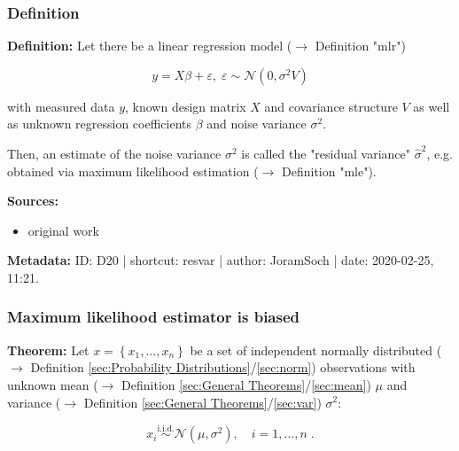 \documentclass[a4paper,12pt]{book}
\begin{document}
\subsubsection[\textit{Definition}]{Definition} \label{sec:resvar}

\vspace{1em}
\textbf{Definition:} Let there be a linear regression model ($\rightarrow$ Definition "mlr")

\begin{equation} \label{eq:resvar-mlr}
y = X\beta + \varepsilon, \; \varepsilon \sim \mathcal{N}(0, \sigma^2 V)
\end{equation}

with measured data $y$, known design matrix $X$ and covariance structure $V$ as well as unknown regression coefficients $\beta$ and noise variance $\sigma^2$.

Then, an estimate of the noise variance $\sigma^2$ is called the "residual variance" $\hat{\sigma}^2$, e.g. obtained via maximum likelihood estimation ($\rightarrow$ Definition "mle").

\vspace{1em}
\textbf{Sources:}
\begin{itemize}
\item original work\end{itemize}


\vspace{1em}
\textbf{Metadata:} ID: D20 | shortcut: resvar | author: JoramSoch | date: 2020-02-25, 11:21.


\subsubsection[\textbf{Maximum likelihood estimator is biased}]{Maximum likelihood estimator is biased} \label{sec:resvar-bias}

\vspace{1em}
\textbf{Theorem:} Let $x = \left\lbrace x_1, \ldots, x_n \right\rbrace$ be a set of independent normally distributed ($\rightarrow$ Definition \ref{sec:Probability Distributions}/\ref{sec:norm}) observations with unknown mean ($\rightarrow$ Definition \ref{sec:General Theorems}/\ref{sec:mean}) $\mu$ and variance ($\rightarrow$ Definition \ref{sec:General Theorems}/\ref{sec:var}) $\sigma^2$:

\begin{equation} \label{eq:resvar-bias-ug}
x_i \overset{\text{i.i.d.}}{\sim} \mathcal{N}(\mu, \sigma^2), \quad i = 1,\ldots,n \; .
\end{equation}
\end{document}
